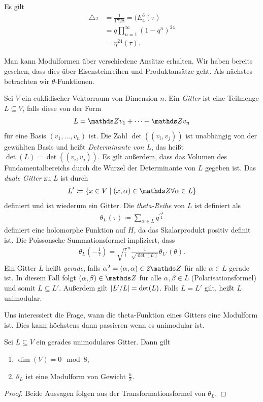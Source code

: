 \begin{cor}
Es gilt
\begin{align*}
\bigtriangleup{\tau}&=\frac{1}{1728}=(E_4^3(\tau)\\
&=q\prod_{n=1}^\infty (1-q^n)^{24}\\
&=\eta^{24}(\tau).
\end{align*}
\end{cor}

Man kann Modulformen über verschiedene Ansätze erhalten.
Wir haben bereits gesehen, dass dies über Eisensteinreihen und Produktansätze geht.
Als nächstes betrachten wir $\theta$-Funktionen.

Sei $V$ ein euklidischer Vektorraum von Dimension $n$.
Ein \emph{Gitter} ist eine Teilmenge $L\subseteq V$, falls diese von der Form
\begin{align*}
L=\Z v_1+\dots + \Z v_n
\end{align*}
für eine Basis $(v_1,\dots,v_n)$ ist.
Die Zahl $\det((v_i,v_j))$ ist unabhängig von der gewählten Basis
und heißt \emph{Determinante von $L$}, das heißt $\det(L)=\det((v_i,v_j))$.
Es gilt außerdem, dass das Volumen des Fundamentalbereichs durch die Wurzel der Determinante von $L$ gegeben ist.
Das \emph{duale Gitter} zu $L$ ist durch
\begin{align*}
L'\coloneqq \{ x\in V \mid (x,\alpha) \in \Z \forall \alpha \in L\}
\end{align*}
definiert und ist wiederum ein Gitter.
Die \emph{theta-Reihe} von $L$ ist definiert als
\begin{align*}
\theta_L(\tau)\coloneqq \sum_{\alpha \in L} q^{\frac{\alpha^2}{2}}
\end{align*}
definiert eine holomorphe Funktion auf $H$, da das Skalarprodukt
positiv definit ist.
Die Poissonsche Summationsformel impliziert, dass
\begin{align*}
\theta_L\left(-\frac{1}{\tau}\right) = \sqrt{\frac{\tau}{\mathrm{i}}}^n \frac{1}{\sqrt{\det(L)}} \theta_{L'}(\theta).
\end{align*}
Ein Gitter $L$ heißt \emph{gerade}, falls $\alpha^2=(\alpha,\alpha)\in 2\Z$ für alle $\alpha \in L$ gerade ist.
In diesem Fall folgt $(\alpha,\beta)\in \Z$ für alle $\alpha,\beta \in L$ (Polarisationsformel) und somit $L\subseteq L'$.
Außerdem gilt $\left\vert L'/L\right\vert=\det(L)$.
Falls $L=L'$ gilt, heißt $L$ unimodular.

Uns interessiert die Frage, wann die theta-Funktion eines Gitters eine Modulform ist.
Dies kann höchstens dann passieren wenn es unimodular ist.
\begin{thm}
Sei $L\subseteq V$ ein gerades unimodulares Gitter. Dann gilt
\begin{enumerate}[label=\roman*)]
\item $\dim(V)=0\mod 8$,
\item $\theta_L$ ist eine Modulform von Gewicht $\frac{n}{2}$.
\end{enumerate}
\end{thm}
\begin{proof}
Beide Aussagen folgen aus der Transformationsformel von $\theta_L$.
\end{proof}

